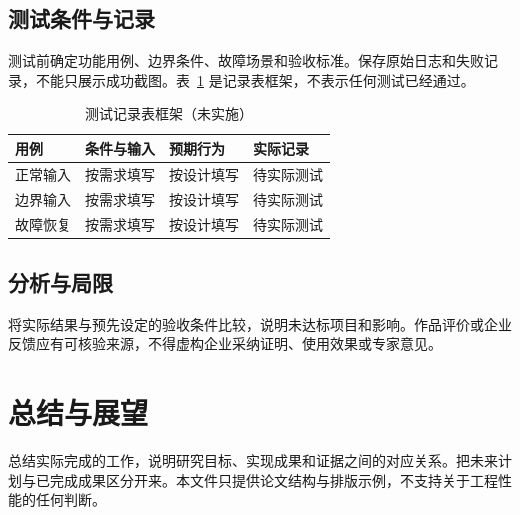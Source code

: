 \subsection{测试条件与记录}
测试前确定功能用例、边界条件、故障场景和验收标准。保存原始日志和失败记录，不能只展示成功截图。表~\ref{tab:test} 是记录表框架，不表示任何测试已经通过。
\begin{table}[htbp]\centering\caption{测试记录表框架（未实施）}\label{tab:test}
\begin{tabularx}{\linewidth}{lXXX}\toprule 用例 & 条件与输入 & 预期行为 & 实际记录\\\midrule
正常输入 & 按需求填写 & 按设计填写 & 待实际测试\\
边界输入 & 按需求填写 & 按设计填写 & 待实际测试\\
故障恢复 & 按需求填写 & 按设计填写 & 待实际测试\\\bottomrule\end{tabularx}
\end{table}
\subsection{分析与局限}
将实际结果与预先设定的验收条件比较，说明未达标项目和影响。作品评价或企业反馈应有可核验来源，不得虚构企业采纳证明、使用效果或专家意见。
\section{总结与展望}
总结实际完成的工作，说明研究目标、实现成果和证据之间的对应关系。把未来计划与已完成成果区分开来。本文件只提供论文结构与排版示例，不支持关于工程性能的任何判断。
